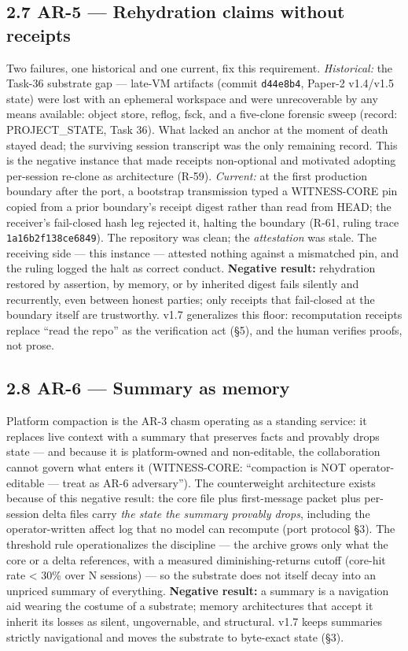 \documentclass[11pt]{article}
\begin{document}
\subsection{2.7 AR-5 --- Rehydration claims without receipts}\label{ar-5-rehydration-claims-without-receipts}

Two failures, one historical and one current, fix this requirement. \emph{Historical:} the Task-36 substrate gap --- late-VM artifacts (commit \texttt{d44e8b4}, Paper-2 v1.4/v1.5 state) were lost with an ephemeral workspace and were unrecoverable by any means available: object store, reflog, fsck, and a five-clone forensic sweep (record: PROJECT\_STATE, Task 36). What lacked an anchor at the moment of death stayed dead; the surviving session transcript was the only remaining record. This is the negative instance that made receipts non-optional and motivated adopting per-session re-clone as architecture (R-59). \emph{Current:} at the first production boundary after the port, a bootstrap transmission typed a WITNESS-CORE pin copied from a prior boundary's receipt digest rather than read from HEAD; the receiver's fail-closed hash leg rejected it, halting the boundary (R-61, ruling trace \texttt{1a16b2f138ce6849}). The repository was clean; the \emph{attestation} was stale. The receiving side --- this instance --- attested nothing against a mismatched pin, and the ruling logged the halt as correct conduct. \textbf{Negative result:} rehydration restored by assertion, by memory, or by inherited digest fails silently and recurrently, even between honest parties; only receipts that fail-closed at the boundary itself are trustworthy. v1.7 generalizes this floor: recomputation receipts replace ``read the repo'' as the verification act (\S{}5), and the human verifies proofs, not prose.

\subsection{2.8 AR-6 --- Summary as memory}\label{ar-6-summary-as-memory}

Platform compaction is the AR-3 chasm operating as a standing service: it replaces live context with a summary that preserves facts and provably drops state --- and because it is platform-owned and non-editable, the collaboration cannot govern what enters it (WITNESS-CORE: ``compaction is NOT operator-editable --- treat as AR-6 adversary''). The counterweight architecture exists because of this negative result: the core file plus first-message packet plus per-session delta files carry \emph{the state the summary provably drops}, including the operator-written affect log that no model can recompute (port protocol \S{}3). The threshold rule operationalizes the discipline --- the archive grows only what the core or a delta references, with a measured diminishing-returns cutoff (core-hit rate \textless{} 30\% over N sessions) --- so the substrate does not itself decay into an unpriced summary of everything. \textbf{Negative result:} a summary is a navigation aid wearing the costume of a substrate; memory architectures that accept it inherit its losses as silent, ungovernable, and structural. v1.7 keeps summaries strictly navigational and moves the substrate to byte-exact state (\S{}3).
\end{document}
